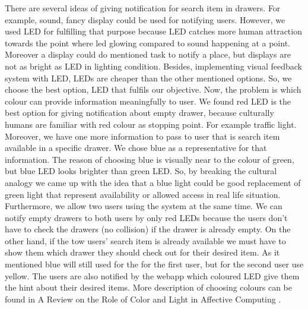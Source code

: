 There are several ideas of giving notification for search item in drawers. 
For example, sound, fancy display could be used for notifying users.
However, we used LED for fulfilling that purpose because LED catches more human attraction towards the point where led glowing compared to sound happening at a point. 
Moreover a display could do mentioned task to notify a place, but displays are not as bright as LED in lighting condition. 
Besides, implementing visual feedback system with LED, LEDs are cheaper than the other mentioned options.
So, we choose the best option, LED that fulfils our objective. 
Now, the problem is which colour can provide information meaningfully to user. 
We found red LED is the best option for giving notification about empty drawer, because culturally humans are familiar with red colour as stopping point. 
For example traffic light. 
Moreover, we have one more information to pass to user that is search item available in a specific drawer. 
We chose blue as a representative for that information. 
The reason of choosing blue is  visually near to the colour of green, but blue LED looks brighter than green LED. 
So, by breaking the cultural analogy we came up with the idea that a blue light could be good replacement of green light that represent availability or allowed access in real life situation. 
Furthermore, we allow two users using the system at the same time. 
We can notify empty drawers to both users by only red LEDs because the users don't have to check the drawers (no collision) if the drawer is already empty. 
On the other hand, if the tow users' search item is already available we must have to show them which drawer they should check out for their desired item. 
As it mentioned blue will still used for the for the first user, but for the second user use yellow. 
The users are also notified by the webapp which coloured LED give them the hint about their desired items.
More description of choosing colours can be found in A Review on the Role of Color and Light in Affective Computing \cite{RefWorks:coloreffect}.